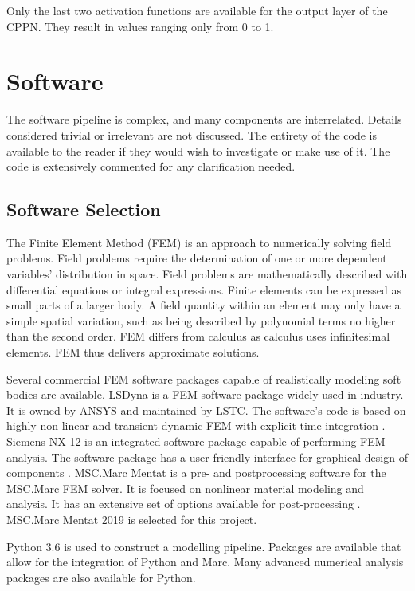 Only the last two activation functions are available for the output layer of the CPPN. They result in values ranging only from 0 to 1.

\section{Software}
\label{sec:SW}

The software pipeline is complex, and many components are interrelated. Details considered trivial or irrelevant are not discussed. The entirety of the code is available to the reader if they would wish to investigate or make use of it. The code is extensively commented for any clarification needed.

\subsection{Software Selection}

The Finite Element Method (FEM) is an approach to numerically solving field problems. Field problems require the determination of one or more dependent variables' distribution in space. Field problems are mathematically described with differential equations or integral expressions. Finite elements can be expressed as small parts of a larger body. A field quantity within an element may only have a simple spatial variation, such as being described by polynomial terms no higher than the second order. FEM differs from calculus as calculus uses infinitesimal elements. FEM thus delivers approximate solutions. \cite{Cook2002}

Several commercial FEM software packages capable of realistically modeling soft bodies are available. LSDyna is a FEM software package widely used in industry. It is owned by ANSYS and maintained by LSTC. The software's code is based on highly non-linear and transient dynamic FEM with explicit time integration \cite{LSDyna}. Siemens NX 12 is an integrated software package capable of performing FEM analysis. The software package has a user-friendly interface for graphical design of components \cite{NX12}. MSC.Marc Mentat is a pre- and postprocessing software for the MSC.Marc FEM solver. It is focused on nonlinear material modeling and analysis. It has an extensive set of options available for post-processing \cite{MSC}. MSC.Marc Mentat 2019 is selected for this project.

Python 3.6 is used to construct a modelling pipeline. Packages are available that allow for the integration of Python and Marc. Many advanced numerical analysis packages are also available for Python.

